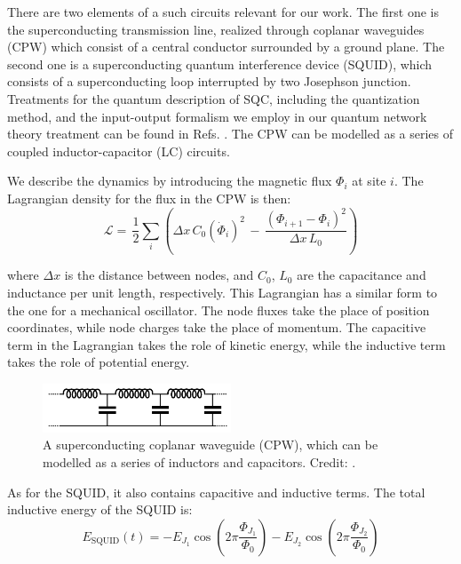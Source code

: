 There are two elements of a such circuits relevant for our work. The first one is the superconducting transmission line, realized through coplanar waveguides (CPW) which consist of a central conductor surrounded by a ground plane. The second one is a superconducting quantum interference device (SQUID), which consists of a superconducting loop interrupted by two Josephson junction.
Treatments for the quantum description of SQC, including the quantization method, and the input-output formalism we employ in our quantum network theory treatment can be found in Refs. \cite{Yurke1984, Vool2017}. The CPW can be modelled as a series of coupled inductor-capacitor (LC) circuits. 

We describe the dynamics by introducing the magnetic flux $\Phi_i$ at site $i$. The Lagrangian density for the flux in the CPW is then: 
%
\begin{equation}\label{eq:CPW_lagrangian}
\mathcal{L} = \, \frac{1}{2} \sum_i \left( \Delta x \, C_{0} \left(\dot{\Phi}_{i}\right)^{2} \, - \, 
\frac{\left(\Phi_{i+1}-\Phi_{i}\right)^{2}}{\Delta x \, L_{0}} \right)
\end{equation}

\noindent
where $\Delta x$ is the distance between nodes, and $C_0$, $L_0$ are the capacitance and inductance per unit length, respectively. This Lagrangian has a similar form to the one for a mechanical oscillator. The node fluxes take the place of position coordinates, while node charges take the place of momentum. The capacitive term in the Lagrangian takes the role of kinetic energy, while the inductive term takes the role of potential energy.

\begin{figure}[h]
    \centering
    \includegraphics[width=0.5\textwidth,keepaspectratio]{figures/intro/LC_Vool2017.png}
    \caption{A superconducting coplanar waveguide (CPW), which can be modelled as a series of inductors and capacitors. Credit: \protect\cite{Vool2017}.}
    \label{fig:CPW_diagram}
\end{figure}

\noindent
As for the SQUID, it also contains capacitive and inductive terms. The total inductive energy of the SQUID is:
%
\begin{equation}\label{eq:squid_energy_assym}
    E_{\text{SQUID}}(t) = - E_{J_1} \cos{\left(2\pi
    \frac{\Phi_{J_1}}{\Phi_0}\right)} - E_{J_2} \cos{\left(2\pi
    \frac{\Phi_{J_2}}{\Phi_0}\right)}
\end{equation}

